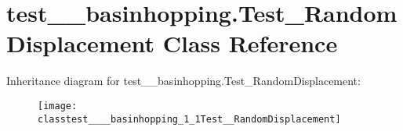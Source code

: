 \hypertarget{classtest____basinhopping_1_1Test__RandomDisplacement}{}\section{test\+\_\+\+\_\+basinhopping.\+Test\+\_\+\+Random\+Displacement Class Reference}
\label{classtest____basinhopping_1_1Test__RandomDisplacement}
Inheritance diagram for test\+\_\+\+\_\+basinhopping.\+Test\+\_\+\+Random\+Displacement\+:\begin{figure}[H]
\begin{center}
\leavevmode
\texttt{[image: classtest\_\_\_\_basinhopping\_1\_1Test\_\_RandomDisplacement]}
\end{center}
\end{figure}

